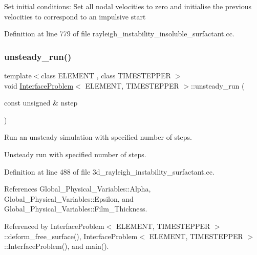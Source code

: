Set initial conditions\+: Set all nodal velocities to zero and initialise the previous velocities to correspond to an impulsive start 

Definition at line 779 of file rayleigh\+\_\+instability\+\_\+insoluble\+\_\+surfactant.\+cc.

\mbox{\label{classInterfaceProblem_a241f0290d26462badbe9bb0e1e0d10a5}} 
\subsubsection{\texorpdfstring{unsteady\+\_\+run()}{unsteady\_run()}\hspace{0.1cm}{\footnotesize\ttfamily [1/3]}}
{\footnotesize\ttfamily template$<$class E\+L\+E\+M\+E\+NT , class T\+I\+M\+E\+S\+T\+E\+P\+P\+ER $>$ \\
void \hyperlink{classInterfaceProblem}{Interface\+Problem}$<$ E\+L\+E\+M\+E\+NT, T\+I\+M\+E\+S\+T\+E\+P\+P\+ER $>$\+::unsteady\+\_\+run (\begin{DoxyParamCaption}\item[{const unsigned \&}]{nstep }\end{DoxyParamCaption})}



Run an unsteady simulation with specified number of steps. 

Unsteady run with specified number of steps. 

Definition at line 488 of file 3d\+\_\+rayleigh\+\_\+instability\+\_\+surfactant.\+cc.



References Global\+\_\+\+Physical\+\_\+\+Variables\+::\+Alpha, Global\+\_\+\+Physical\+\_\+\+Variables\+::\+Epsilon, and Global\+\_\+\+Physical\+\_\+\+Variables\+::\+Film\+\_\+\+Thickness.



Referenced by Interface\+Problem$<$ E\+L\+E\+M\+E\+N\+T, T\+I\+M\+E\+S\+T\+E\+P\+P\+E\+R $>$\+::deform\+\_\+free\+\_\+surface(), Interface\+Problem$<$ E\+L\+E\+M\+E\+N\+T, T\+I\+M\+E\+S\+T\+E\+P\+P\+E\+R $>$\+::\+Interface\+Problem(), and main().

\mbox{\label{classInterfaceProblem_adf1f4e43d10939e4323e0e315b711085}} 
